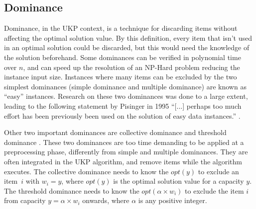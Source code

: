 \documentclass[runningheads,a4paper]{llncs}
\begin{document}

\subsection{Dominance}

Dominance, in the UKP context, is a technique for discarding items without affecting the optimal solution value. 
By this definition, every item that isn't used in an optimal solution could be discarded, but this would need the knowledge of the solution beforehand. 
Some dominances can be verified in polynomial time over \(n\), and can speed up the resolution of an NP-Hard problem reducing the instance input size. 
Instances where many items can be excluded by the two simplest dominances (simple dominance and multiple dominance) are known as ``easy'' instances. 
Research on these two dominances was done to a large extent, leading to the following statement by Pisinger in 1995
``[...] perhaps too much effort has been previously been used on the solution of easy data instances.'' \cite[p. 20]{pisinger1995}.

Other two important dominances are collective dominance and threshold dominance \cite{pya}. 
These two dominances are too time demanding to be applied at a preprocessing phase, differently from simple and multiple dominances. 
They are often integrated in the UKP algorithm, and remove items while the algorithm executes. 
The collective dominance needs to know the \(opt(y)\) to exclude an item~\(i\) with \(w_i = y\), where \(opt(y)\) is the optimal solution value for a capacity \(y\).
The threshold dominance needs to know the \(opt(\alpha\times w_i)\) to exclude the item \(i\) from capacity \(y = \alpha\times w_i\) onwards, where \(\alpha\) is any positive integer.

\end{document}
